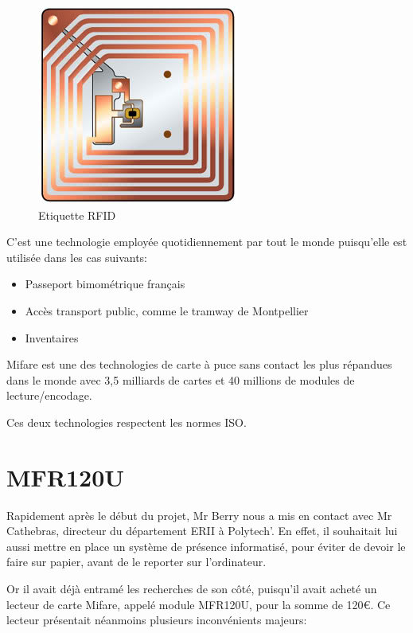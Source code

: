     \begin{figure}[h]
        \begin{center}
            \includegraphics[scale=0.3]{images/RFIDtag.jpg} 
        \end{center}

        \caption{Etiquette RFID}
        \label{Etiquette RFID}
    \end{figure}


C'est une technologie employée quotidiennement par tout le monde puisqu'elle
est utilisée dans les cas suivants:

    \begin{itemize}
    \item Passeport bimométrique français
    \item Accès transport public, comme le tramway de Montpellier
    \item Inventaires
    \end{itemize}

Mifare est une des technologies de carte à puce sans contact les plus répandues
dans le monde avec 3,5 milliards de cartes et 40 millions de modules de lecture/encodage.

Ces deux technologies respectent les normes ISO.


    \section{MFR120U}
Rapidement après le début du projet, Mr Berry nous a mis en contact avec Mr
Cathebras, directeur du département ERII à Polytech'. En effet, il souhaitait lui
aussi mettre en place un système de présence informatisé, pour éviter de devoir
le faire sur papier, avant de le reporter sur l'ordinateur.

Or il avait déjà entramé les recherches de son côté, puisqu'il avait acheté un lecteur de carte 
Mifare, appelé module MFR120U, pour la somme de 120\euro. Ce lecteur présentait néanmoins
plusieurs inconvénients majeurs:

